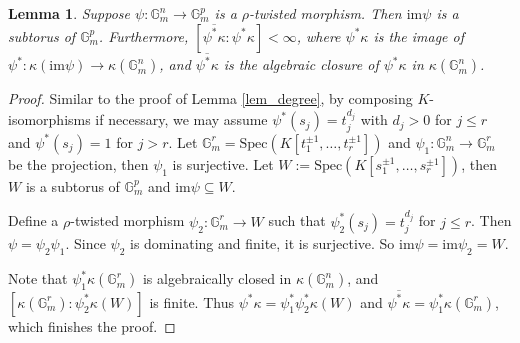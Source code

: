 \documentclass[12pt]{amsart}
\theoremstyle{plain}
\newtheorem{lemma}[theorem]{Lemma}
\theoremstyle{definition}
\theoremstyle{question}
\theoremstyle{remark}
\theoremstyle{assumption}
\numberwithin{equation}{section}
\theoremstyle{bigthm}
\begin{document}
\begin{lemma}\label{lem_morphism_image}
Suppose $\psi \colon  \mathbb{G}_{m}^{n} \rightarrow \mathbb{G}_{m}^{p}$ is a $\rho$-twisted morphism. Then $\mathrm{im} \psi$ is a subtorus of $\mathbb{G}_{m}^{p}$. Furthermore, $[\overline{\psi^{*} \kappa} : \psi^{*} \kappa] < \infty$, where $\psi^{*} \kappa$ is the image of $\psi^{*} \colon  \kappa (\mathrm{im} \psi) \rightarrow \kappa (\mathbb{G}_{m}^{n})$, and $\overline{\psi^{*} \kappa}$ is the algebraic closure of $\psi^{*} \kappa$ in $\kappa (\mathbb{G}_{m}^{n})$.
\end{lemma}
\begin{proof}
Similar to the proof of Lemma \ref{lem_degree}, by composing $K$-isomorphisms if necessary, we may assume $\psi^{*} (s_{j}) = t_{j}^{d_{j}}$ with $d_{j} >0$ for $j \le r$ and $\psi^{*} (s_{j}) = 1$ for $j>r$. Let $\mathbb{G}_{m}^{r} = \mathrm{Spec}(K[t_{1}^{\pm 1}, \dots, t_{r}^{\pm 1}])$ and $\psi_{1} \colon  \mathbb{G}_{m}^{n} \rightarrow \mathbb{G}_{m}^{r}$ be the projection, then $\psi_{1}$ is surjective. Let $W:= \mathrm{Spec}(K[s_{1}^{\pm 1}, \dots, s_{r}^{\pm 1}])$, then $W$ is a subtorus of $\mathbb{G}_{m}^{p}$ and $\mathrm{im} \psi \subseteq W$.

Define a $\rho$-twisted morphism $\psi_{2} \colon  \mathbb{G}_{m}^{r} \rightarrow W$ such that $\psi_{2}^{*} (s_{j}) = t_{j}^{d_{j}}$ for $j \le r$. Then $\psi = \psi_{2} \psi_{1}$. Since $\psi_{2}$ is dominating and finite, it is surjective. So $\mathrm{im} \psi = \mathrm{im} \psi_{2} = W$.

Note that $\psi_{1}^{*} \kappa (\mathbb{G}_{m}^{r})$ is algebraically closed in $\kappa (\mathbb{G}_{m}^{n})$, and $[\kappa (\mathbb{G}_{m}^{r}): \psi_{2}^{*} \kappa (W)]$ is finite. Thus $\psi^{*} \kappa = \psi_{1}^{*} \psi_{2}^{*} \kappa (W)$ and $\overline{\psi^{*} \kappa} = \psi_{1}^{*} \kappa (\mathbb{G}_{m}^{r})$, which finishes the proof.
\end{proof}
\end{document}
